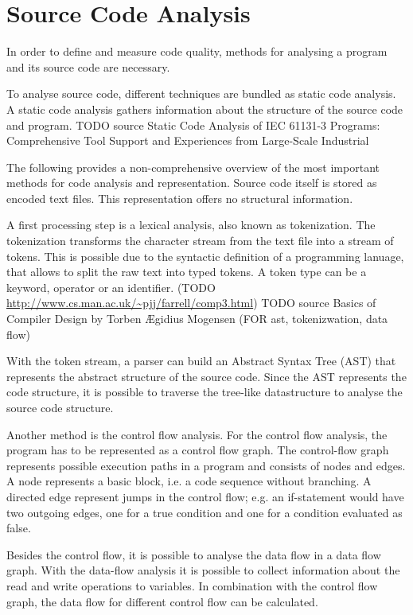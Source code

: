 \section{Source Code Analysis}\label{sec:code_analysis}
In order to define and measure code quality, methods for analysing a program and its source code are necessary.

To analyse source code, different techniques are bundled as static code analysis. A static code analysis gathers information about the structure of the source code and program. TODO source Static Code Analysis of IEC 61131-3 Programs: Comprehensive Tool Support and Experiences from Large-Scale Industrial 

The following provides a non-comprehensive overview of the most important methods for code analysis and representation.
Source code itself is stored as encoded text files. This representation offers no structural information. 

A first processing step is a lexical analysis, also known as tokenization. The tokenization transforms the character stream from the text file into a stream of tokens. This is possible due to the syntactic definition of a programming lanuage, that allows to split the raw text into typed tokens. A token type can be a keyword, operator or an identifier.
(TODO \url{http://www.cs.man.ac.uk/~pjj/farrell/comp3.html})
TODO source Basics of Compiler Design by Torben Ægidius Mogensen (FOR ast, tokenizwation, data flow)

With the token stream, a parser can build an Abstract Syntax Tree (AST) that represents the abstract structure of the source code.
Since the AST represents the code structure, it is possible to traverse the tree-like datastructure to analyse the source code structure.

Another method is the control flow analysis. For the control flow analysis, the program has to be represented as a control flow graph. The control-flow graph represents possible execution paths in a program and consists of nodes and edges. A node represents a basic block, i.e. a code sequence without branching. A directed edge represent jumps in the control flow; e.g. an if-statement would have two outgoing edges, one for a true condition and one for a condition evaluated as false.

Besides the control flow, it is possible to analyse the data flow in a data flow graph. With the data-flow analysis it is possible to collect information about the read and write operations to variables. In combination with the control flow graph, the data flow for different control flow can be calculated.

